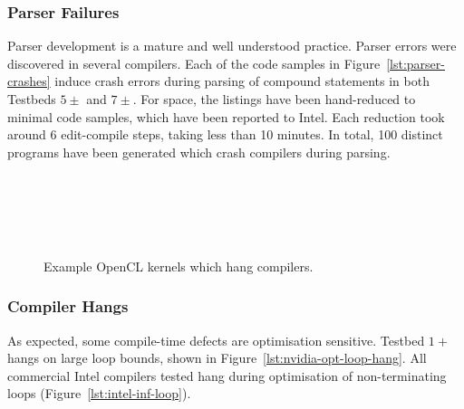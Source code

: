 \subsubsection{Parser Failures}

Parser development is a mature and well understood practice. Parser errors were discovered in several compilers. Each of the code samples in Figure~\ref{lst:parser-crashes} induce crash errors during parsing of compound statements in both Testbeds $5\pm$ and $7\pm$. For space, the listings have been hand-reduced to minimal code samples, which have been reported to Intel. Each reduction took around 6 edit-compile steps, taking less than 10 minutes. In total, 100 distinct programs have been generated which crash compilers during parsing.

\begin{figure}
  \centering %
  \\%
  \\%
  \\%
  \\%
  \caption[Example kernels which hang compilers]{%
    Example OpenCL kernels which hang compilers.%
  }%
  \label{lst:compiler-hangs}
\end{figure}

\subsubsection{Compiler Hangs}

As expected, some compile-time defects are optimisation sensitive. Testbed $1+$ hangs on large loop bounds, shown in Figure~\ref{lst:nvidia-opt-loop-hang}. All commercial Intel compilers  tested hang during optimisation of non-terminating loops (Figure~\ref{lst:intel-inf-loop}).

